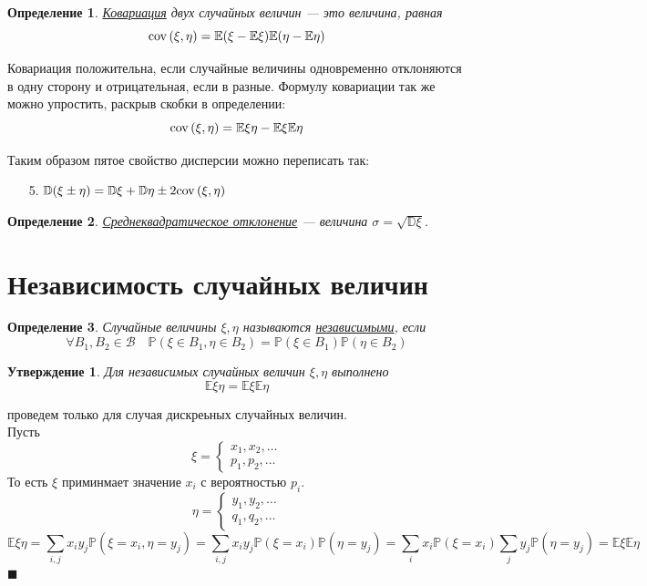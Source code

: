\documentclass[12pt]{article}
\newtheorem{Def}{Определение}
\newtheorem{St}{Утверждение}
\newenvironment{Proof}{\par\noindent{\bf Доказательство}}{$\blacksquare$}
\numberwithin{Th}{section}
\numberwithin{Def}{section}
\numberwithin{Lem}{section}
\numberwithin{St}{section}
\numberwithin{equation}{section}
\newcommand\Pro{\mathbb{P}} %
\newcommand\Bor{\mathscr{B}} %
\newcommand\Expec{\mathbb{E}} %
\newcommand\Disp{\mathbb{D}}  %
\newcommand\Cov{{\rm cov \,}} %
\begin{document}
\begin{Def}
\underline{Ковариация} двух случайных величин --- это величина, равная
$$ \Cov(\xi,\eta) = \Expec(\xi - \Expec\xi)\Expec(\eta - \Expec\eta)$$
\end{Def}

Ковариация положительна, если случайные величины одновременно отклоняются в одну сторону и отрицательная, если в разные. Формулу ковариации так же можно упростить, раскрыв скобки в определении:
$$\Cov(\xi,\eta) = \Expec\xi\eta - \Expec\xi\Expec\eta$$

Таким образом пятое свойство дисперсии можно переписать так:
\begin{itemize}
	\item[5.] $\Disp(\xi \pm \eta) = \Disp\xi + \Disp\eta \pm 2\Cov(\xi,\eta)$
\end{itemize}

\begin{Def}
\underline{Среднеквадратическое отклонение} --- величина $\sigma = \sqrt{\Disp\xi}$.
\end{Def}



\newpage
\section{Независимость случайных величин}
\begin{Def}
	Случайные величины $\xi, \eta$ называются \underline{независимыми}, если 
	 $$ \forall B_1, B_2 \in \Bor \quad \Pro(\xi \in B_1, \eta \in B_2) = \Pro(\xi \in B_1)\Pro(\eta \in B_2) $$
\end{Def}

\begin{St}
Для независимых случайных величин $\xi, \eta$ выполнено
$$\Expec\xi\eta = \Expec\xi\Expec\eta$$
\end{St}
\begin{Proof}
проведем только для случая дискреьных случайных величин.\\
Пусть 
\[
   	\xi = 
  	\begin{cases}
  		x_1, x_2, \ldots \\
  		p_1, p_2, \ldots
  	\end{cases}
  \]
  То есть $\xi$ приминмает значение $x_i$ с вероятностью $p_i$.
  \[
   	\eta = 
  	\begin{cases}
  		y_1, y_2, \ldots \\
  		q_1, q_2, \ldots
  	\end{cases}
  \]
  $$\Expec\xi\eta=\sum\limits_{i,j} x_iy_j\Pro(\xi=x_i, \eta=y_j) = \sum\limits_{i,j} x_iy_j\Pro(\xi=x_i)\Pro(\eta=y_j) =  \sum\limits_{i} x_i\Pro(\xi=x_i)\sum\limits_j y_j\Pro(\eta=y_j) = \Expec\xi\Expec\eta$$
\end{Proof}
\end{document}
